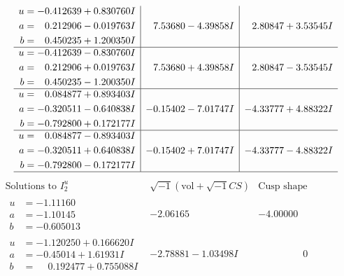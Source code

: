 \documentclass[1p]{elsarticle_modified}
\theoremstyle{definition}
\newcommand{\I}{\sqrt{-1}}
\begin{document}
$$\begin{array}{c|c|c}
\begin{aligned}
u &= -0.412639 + 0.830760 I \\
a &= \phantom{-}0.212906 - 0.019763 I \\
b &= \phantom{-}0.450235 + 1.200350 I\end{aligned}
 & \phantom{-}7.53680 - 4.39858 I & \phantom{-}2.80847 + 3.53545 I \\ \hline\begin{aligned}
u &= -0.412639 - 0.830760 I \\
a &= \phantom{-}0.212906 + 0.019763 I \\
b &= \phantom{-}0.450235 - 1.200350 I\end{aligned}
 & \phantom{-}7.53680 + 4.39858 I & \phantom{-}2.80847 - 3.53545 I \\ \hline\begin{aligned}
u &= \phantom{-}0.084877 + 0.893403 I \\
a &= -0.320511 - 0.640838 I \\
b &= -0.792800 + 0.172177 I\end{aligned}
 & -0.15402 - 7.01747 I & -4.33777 + 4.88322 I \\ \hline\begin{aligned}
u &= \phantom{-}0.084877 - 0.893403 I \\
a &= -0.320511 + 0.640838 I \\
b &= -0.792800 - 0.172177 I\end{aligned}
 & -0.15402 + 7.01747 I & -4.33777 - 4.88322 I\\
 \hline 
 \end{array}$$\newpage$$\begin{array}{c|c|c}  
\text{Solutions to }I^u_{2}& \I (\text{vol} + \sqrt{-1}CS) & \text{Cusp shape}\\
 \hline 
\begin{aligned}
u &= -1.11160\phantom{ +0.000000I} \\
a &= -1.10145\phantom{ +0.000000I} \\
b &= -0.605013\phantom{ +0.000000I}\end{aligned}
 & -2.06165\phantom{ +0.000000I} & -4.00000\phantom{ +0.000000I} \\ \hline\begin{aligned}
u &= -1.120250 + 0.166620 I \\
a &= -0.45014 + 1.61931 I \\
b &= \phantom{-}0.192477 + 0.755088 I\end{aligned}
 & -2.78881 - 1.03498 I & \phantom{-0.000000 } 0 \\ \hline\begin{aligned}

\end{aligned}
\end{array}$$
\end{document}
